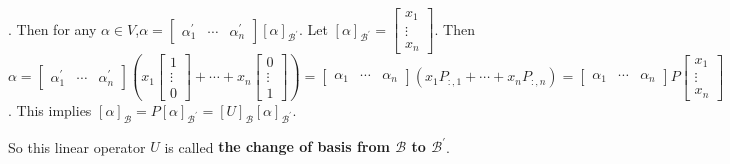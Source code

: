 \documentclass[8pt]{beamer}
\newcommand{\mc}[1]{\mathcal{#1}}
\newcommand{\tb}[1]{\textbf{#1}}
\begin{document}
\begin{frame}{.}
    Then for any $\alpha \in V$,$\alpha = \left[\begin{matrix}
        \alpha_1^\prime & \cdots & \alpha_n^\prime 
    \end{matrix}\right] [\alpha]_{\mc{B}^\prime}$.
    Let $[\alpha]_{\mc{B}^\prime} = \left[\begin{matrix}
        x_1 \\ \vdots \\ x_n
    \end{matrix}\right]$.
    Then $\alpha = \left[\begin{matrix}
    \alpha_1^\prime & \cdots & \alpha_n^\prime
    \end{matrix}\right]\left(x_1 \left[\begin{matrix}
        1 \\ \vdots \\ 0
    \end{matrix}\right] + \cdots + x_n \left[\begin{matrix}
        0 \\ \vdots \\ 1
    \end{matrix}\right]\right) = \left[\begin{matrix}
    \alpha_1 & \cdots & \alpha_n
    \end{matrix}\right] \left( x_1 P_{:, 1} + \cdots + x_n P_{:, n}\right) = \left[\begin{matrix}
    \alpha_1 & \cdots & \alpha_n
    \end{matrix}\right] P \left[\begin{matrix}
    x_1 \\ \vdots \\ x_n
    \end{matrix}\right]$.
    This implies $[\alpha]_{\mc{B}} = P [\alpha]_{\mc{B}^\prime} = [U]_{\mc{B}}[\alpha]_{\mc{B}^\prime}$.

    \smallskip
    So this linear operator $U$ is called \tb{the change of basis from $\mc{B}$ to $\mc{B}^\prime$}.

\end{frame}
\end{document}
